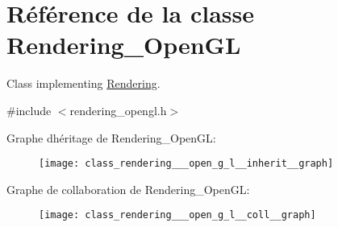 \hypertarget{class_rendering___open_g_l}{}\section{Référence de la classe Rendering\+\_\+\+Open\+GL}
\label{class_rendering___open_g_l}


Class implementing \hyperlink{class_rendering}{Rendering}.  




{\ttfamily \#include $<$rendering\+\_\+opengl.\+h$>$}



Graphe d\textquotesingle{}héritage de Rendering\+\_\+\+Open\+GL\+:\nopagebreak
\begin{figure}[H]
\begin{center}
\leavevmode
\texttt{[image: class\_rendering\_\_\_open\_g\_l\_\_inherit\_\_graph]}
\end{center}
\end{figure}


Graphe de collaboration de Rendering\+\_\+\+Open\+GL\+:\nopagebreak
\begin{figure}[H]
\begin{center}
\leavevmode
\texttt{[image: class\_rendering\_\_\_open\_g\_l\_\_coll\_\_graph]}
\end{center}
\end{figure}
